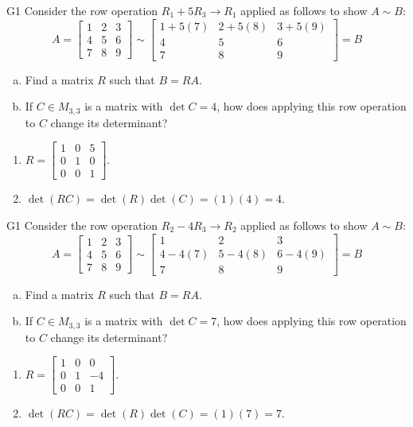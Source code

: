 \begin{problem}{G1}
Consider the row operation \(R_1+5R_3\to R_1\) applied as follows to show
\(A\sim B\):
\[
A=\begin{bmatrix}1&2&3\\4&5&6\\7&8&9\end{bmatrix}
  \sim
\begin{bmatrix}1+5(7)&2+5(8)&3+5(9)\\4&5&6\\7&8&9\end{bmatrix}=B
\]
\begin{enumerate}[(a)]
\item Find a matrix \(R\) such that \(B=RA\).
\item If \(C \in M_{3,3}\) is a matrix with \(\det C = 4\), how does applying this row operation to \(C\) change its determinant?
\end{enumerate}
\end{problem}
\begin{solution}
\begin{enumerate}
\item \(R= \begin{bmatrix} 1 & 0 & 5 \\ 0 & 1 & 0 \\ 0 & 0 & 1 \end{bmatrix}\).
\item \(\det(RC)= \det(R)\det(C)=(1)(4)=4\).
\end{enumerate}
\end{solution}

\begin{problem}{G1}
Consider the row operation \(R_2-4R_3\to R_2\) applied as follows to show
\(A\sim B\):
\[
A=\begin{bmatrix}1&2&3\\4&5&6\\7&8&9\end{bmatrix}
  \sim
\begin{bmatrix}1&2&3\\4-4(7)&5-4(8)&6-4(9)\\7&8&9\end{bmatrix}=B
\]
\begin{enumerate}[(a)]
\item Find a matrix \(R\) such that \(B=RA\).
\item If \(C \in M_{3,3}\) is a matrix with \(\det C = 7\), how does applying this row operation to \(C\) change its determinant?
\end{enumerate}
\end{problem}
\begin{solution}
\begin{enumerate}
\item \(R= \begin{bmatrix} 1 & 0 & 0 \\ 0 & 1 & -4 \\ 0 & 0 & 1 \end{bmatrix}\).
\item \(\det(RC)= \det(R)\det(C)=(1)(7)=7\).
\end{enumerate}
\end{solution}

